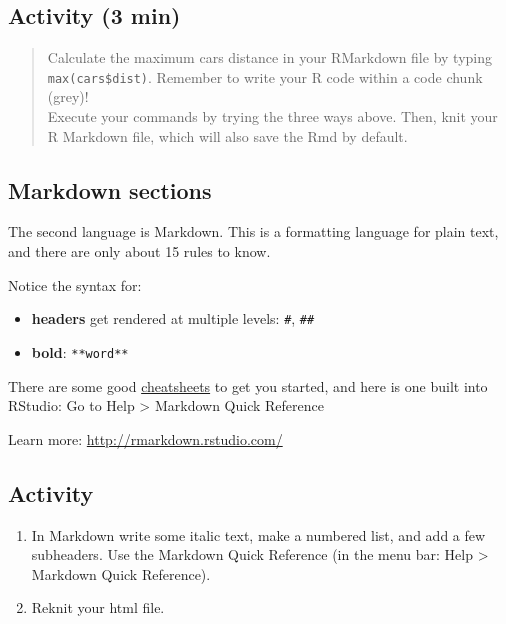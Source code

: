 \documentclass[]{book}
\providecommand{\tightlist}{%
  \setlength{\itemsep}{0pt}\setlength{\parskip}{0pt}}
\begin{document}
\hypertarget{activity-3-min}{%
\subsection{Activity (3 min)}\label{activity-3-min}}

\begin{quote}
Calculate the maximum cars distance in your RMarkdown file by typing \texttt{max(cars\$dist)}. Remember to write your R code within a code chunk (grey)!\\
Execute your commands by trying the three ways above. Then, knit your R Markdown file, which will also save the Rmd by default.
\end{quote}

\hypertarget{markdown-sections}{%
\subsection{Markdown sections}\label{markdown-sections}}

The second language is Markdown. This is a formatting language for plain text, and there are only about 15 rules to know.

Notice the syntax for:

\begin{itemize}
\tightlist
\item
  \textbf{headers} get rendered at multiple levels: \texttt{\#}, \texttt{\#\#}
\item
  \textbf{bold}: \texttt{**word**}
\end{itemize}

There are some good \href{https://github.com/adam-p/markdown-here/wiki/Markdown-Here-Cheatsheet}{cheatsheets} to get you started, and here is one built into RStudio: Go to Help \textgreater{} Markdown Quick Reference

Learn more: \url{http://rmarkdown.rstudio.com/}

\hypertarget{activity-1}{%
\subsection{Activity}\label{activity-1}}

\begin{enumerate}
\def\labelenumi{\arabic{enumi}.}
\tightlist
\item
  In Markdown write some italic text, make a numbered list, and add a few subheaders.
  Use the Markdown Quick Reference (in the menu bar: Help \textgreater{} Markdown Quick Reference).
\item
  Reknit your html file.
\end{enumerate}
\end{document}
